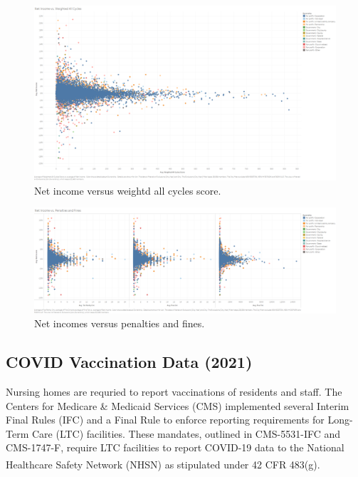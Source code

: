 \documentclass{article}
\theoremstyle{mytheoremstyle}
\theoremstyle{mytheoremstyle}
\theoremstyle{myproblemstyle}
\begin{document}
\begin{figure}[htbp]
\centering
\includegraphics[width=\linewidth]{Images/Net Income vs. Weighted All Cycles.png}
\caption{Net income versus weightd all cycles score.}
\label{fig:net income vs. cycle weighted}
\end{figure}

\begin{figure}[htbp]
\centering
\includegraphics[width=\linewidth]{Images/Net Income vs. Penalties and Fines.png}
\caption{Net incomes versus penalties and fines.}
\label{fig:net income vs penalties and fines}
\end{figure}


\pagebreak

\subsection{COVID Vaccination Data (2021)}
Nursing homes are requried to report vaccinations of residents and staff. The Centers for Medicare \& Medicaid Services (CMS) implemented several Interim Final Rules (IFC) and a Final Rule to enforce reporting requirements for Long-Term Care (LTC) facilities. These mandates, outlined in CMS-5531-IFC and CMS-1747-F, require LTC facilities to report COVID-19 data to the National Healthcare Safety Network (NHSN) as stipulated under 42 CFR 483(g).\textsuperscript{\cite{cmsqso2313}}
\end{document}
